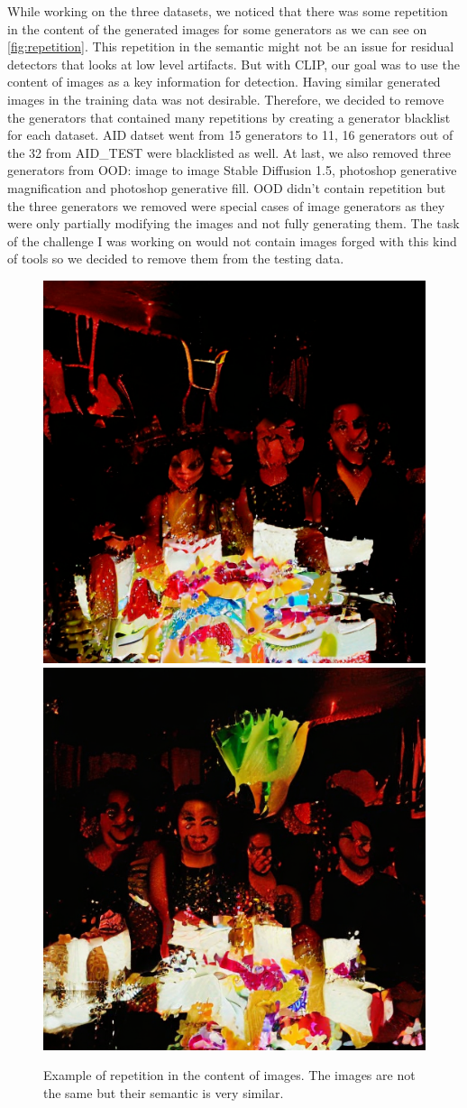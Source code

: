 \documentclass[12pt,a4paper]{article}
\begin{document}
While working on the three datasets, we noticed that there was some repetition in the content of the generated images for some generators as we can see on \autoref{fig:repetition}. This repetition in the semantic might not be an issue for residual detectors that looks at low level artifacts. But with CLIP, our goal was to use the content of images as a key information for detection. Having similar generated images in the training data was not desirable. Therefore, we decided to remove the generators that contained many repetitions by creating a generator blacklist for each dataset. AID datset went from 15 generators to 11, 16 generators out of the 32 from AID\_TEST were blacklisted as well. At last, we also removed three generators from OOD: image to image Stable Diffusion 1.5, photoshop generative magnification and photoshop generative fill. OOD didn't contain repetition but the three generators we removed were special cases of image generators as they were only partially modifying the images and not fully generating them. The task of the challenge I was working on would not contain images forged with this kind of tools so we decided to remove them from the testing data.

\begin{figure}[H]
    \centering
    \includegraphics[width=.49\textwidth]{img/birthday1.png}
    \includegraphics[width=.49\textwidth]{img/birthday2.png}
    \caption{Example of repetition in the content of images. The images are not the same but their semantic is very similar.}
    \label{fig:repetition}
\end{figure}
\end{document}
